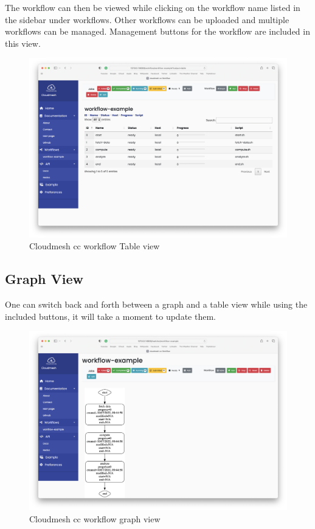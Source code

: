 The workflow can then be viewed while clicking on the workflow name
listed in the sidebar under workflows. Other workflows can be uploaded
and multiple workflows can be managed. Management buttons for the
workflow are included in this view.

\begin{figure}
\centering
\includegraphics{images/service-table.png}
\caption{Cloudmesh cc workflow Table view}
\end{figure}

\hypertarget{graph-view}{%
\subsection{Graph View}\label{graph-view}}

One can switch back and forth between a graph and a table view while
using the included buttons, it will take a moment to update them.

\begin{figure}
\centering
\includegraphics{images/service-graph.png}
\caption{Cloudmesh cc workflow graph view}
\end{figure}
